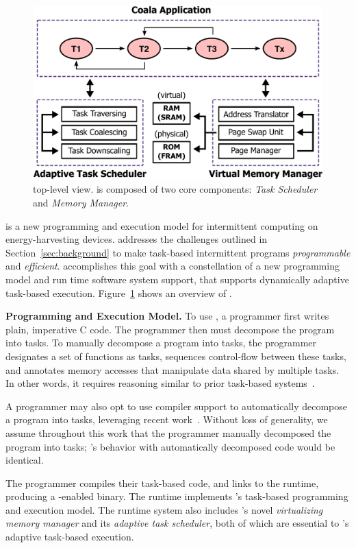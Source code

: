 \begin{figure}
	\centering
	\includegraphics[width=0.45\columnwidth]{figures/overview.pdf}
	\caption{\sys top-level view. \sys is composed of two core components: \emph{Task Scheduler} and \emph{Memory Manager}.}
	\label{fig:system_overview}
\end{figure}

\sys is a new programming and execution model for intermittent computing on energy-harvesting devices. \sys addresses the challenges outlined in Section~\ref{sec:background} to make task-based intermittent programs {\em programmable} and {\em efficient}. \sys accomplishes this goal with a constellation of a new programming model and run time software system support, that supports dynamically adaptive task-based execution. Figure~\ref{fig:system_overview} shows an overview of \sys.

\textbf{\sys Programming and Execution Model.}  To use \sys, a programmer first writes plain, imperative C code. The programmer then must decompose the program into tasks. To manually decompose a program into tasks, the programmer designates a set of functions as tasks, sequences control-flow between these tasks, and annotates memory accesses that manipulate data shared by multiple tasks. In other words, it requires reasoning similar to prior task-based systems~\cite{chain,alpaca}. 

A programmer may also opt to use compiler support to automatically decompose a program into tasks, leveraging recent work~\cite{cleancut_2018,baghsorkhi_cgo_2018}. Without loss of generality, we assume throughout this work that the programmer manually decomposed the program into tasks; \sys's behavior with automatically decomposed code would be identical.

The programmer compiles their task-based code, and links to the \sys runtime,
producing a \sys-enabled binary. The \sys runtime implements \sys's task-based
programming and execution model. The runtime system also includes \sys's novel
{\em virtualizing memory manager} and its {\em adaptive task scheduler}, both
of which are essential to \sys's adaptive task-based execution.

